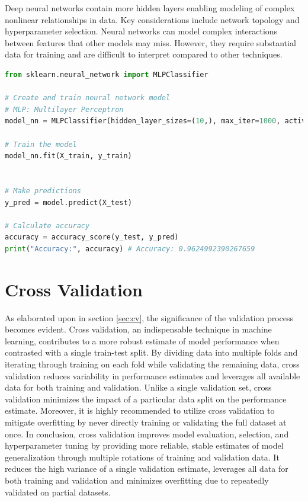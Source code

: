 Deep neural networks contain more hidden layers enabling modeling of complex nonlinear relationships in data. Key considerations include network topology and hyperparameter selection. Neural networks can model complex interactions between features that other models may miss. However, they require substantial data for training and are difficult to interpret compared to other techniques.

\begin{lstlisting}[language=Python]
from sklearn.neural_network import MLPClassifier

# Create and train neural network model
# MLP: Multilayer Perceptron
model_nn = MLPClassifier(hidden_layer_sizes=(10,), max_iter=1000, activation="relu", solver="lbfgs", random_state=42)

# Train the model
model_nn.fit(X_train, y_train)


# Make predictions
y_pred = model.predict(X_test)

# Calculate accuracy
accuracy = accuracy_score(y_test, y_pred)
print("Accuracy:", accuracy) # Accuracy: 0.9624992390267659
\end{lstlisting}


\section{Cross Validation}
As elaborated upon in section \ref{sec:cv}, the significance of the validation process becomes evident. Cross validation, an indispensable technique in machine learning, contributes to a more robust estimate of model performance when contrasted with a single train-test split.
By dividing data into multiple folds and iterating through training on each fold while validating the remaining data, cross validation reduces variability in performance estimates and leverages all available data for both training and validation. Unlike a single validation set, cross validation minimizes the impact of a particular data split on the performance estimate. 
Moreover, it is highly recommended to utilize cross validation to
mitigate overfitting by never directly training or validating the full dataset at once. 
In conclusion, cross validation improves model evaluation, selection, and hyperparameter tuning by providing more reliable, stable estimates of model generalization through multiple rotations of training and validation data. It reduces the high variance of a single validation estimate, leverages all data for both training and validation and minimizes overfitting due to repeatedly validated on partial datasets.





